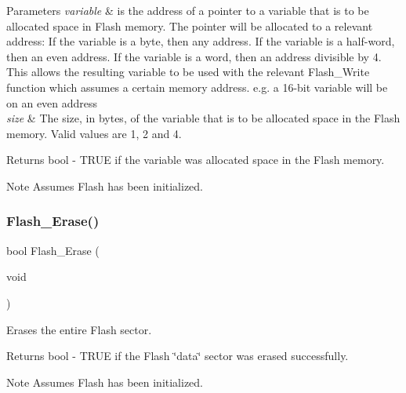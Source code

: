 \begin{DoxyParams}{Parameters}
{\em variable} & is the address of a pointer to a variable that is to be allocated space in Flash memory. The pointer will be allocated to a relevant address\+: If the variable is a byte, then any address. If the variable is a half-\/word, then an even address. If the variable is a word, then an address divisible by 4. This allows the resulting variable to be used with the relevant Flash\+\_\+\+Write function which assumes a certain memory address. e.\+g. a 16-\/bit variable will be on an even address \\
\hline
{\em size} & The size, in bytes, of the variable that is to be allocated space in the Flash memory. Valid values are 1, 2 and 4. \\
\hline
\end{DoxyParams}
\begin{DoxyReturn}{Returns}
bool -\/ T\+R\+UE if the variable was allocated space in the Flash memory. 
\end{DoxyReturn}
\begin{DoxyNote}{Note}
Assumes Flash has been initialized. 
\end{DoxyNote}
\mbox{\label{group__main__module_ga06868787ccef73e69bd236d3b93b68f3}} 
\subsubsection{\texorpdfstring{Flash\+\_\+\+Erase()}{Flash\_Erase()}}
{\footnotesize\ttfamily bool Flash\+\_\+\+Erase (\begin{DoxyParamCaption}\item[{void}]{ }\end{DoxyParamCaption})}



Erases the entire Flash sector. 

\begin{DoxyReturn}{Returns}
bool -\/ T\+R\+UE if the Flash \char`\"{}data\char`\"{} sector was erased successfully. 
\end{DoxyReturn}
\begin{DoxyNote}{Note}
Assumes Flash has been initialized. 
\end{DoxyNote}
\mbox{\label{group__main__module_gaa5782279b5e558cafc2f135c0a1177d3}} 
